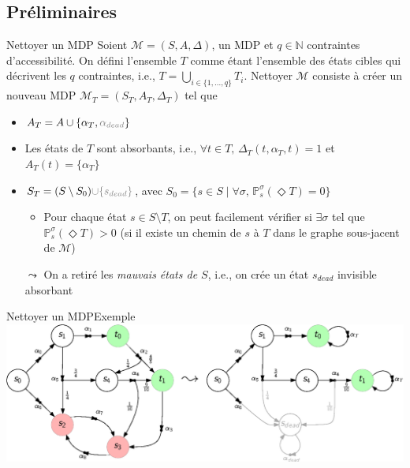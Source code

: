 \documentclass[compress]{beamer}
\theoremstyle{theorem}%
\begin{document}
\subsection{Préliminaires}
\begin{frame}{Nettoyer un MDP}
\footnotesize
  Soient $\mathcal{M} = (S, A, \Delta)$, un MDP et $q \in \mathbb{N}$ contraintes d'accessibilité. On défini l'ensemble $T$ comme étant l'ensemble des états cibles qui décrivent les $q$ contraintes, i.e., $T = \bigcup_{i \in \{1, \dots, q \}} T_i$. {\color{fibeamer@blue}Nettoyer $\mathcal{M}$ consiste à créer un nouveau MDP $\mathcal{M}_T = (S_T, A_T, \Delta_T)$ tel que}
  \begin{itemize}
    \item $A_T = A \cup \{\alpha_T, {\color{gray}\alpha_{dead}}\}$
    \item Les états de $T$ sont absorbants, i.e., $\forall t \in T, \,
      \Delta_T(t, \alpha_T, t) = 1$ et $A_T(t) = \{\alpha_T\}$
    \item $S_T = (S \setminus S_0) {\color{gray}\cup \{s_{dead}\}}$, avec
    $S_0 = \{ s \in S \; | \; \forall \sigma, \, \mathbb{P}^\sigma_s(\Diamond T) = 0 \}$
    \begin{itemize}
      \item {\scriptsize Pour chaque état $s \in S \setminus T$, on peut facilement vérifier si $\exists \sigma$ tel que
    $\mathbb{P}_s^\sigma (\Diamond T) > 0$ (si il existe un chemin de $s$ à $T$ dans le graphe sous-jacent de $\mathcal{M}$)}
    \end{itemize}
    \item[$\leadsto$] On a retiré les \textit{mauvais états de $S$}, i.e., on crée un état \alert{$s_{dead}$ invisible absorbant}
  \end{itemize}
\end{frame}

\begin{frame}{Nettoyer un MDP}{Exemple}
  \includegraphics[width=\linewidth]{resources/clean-up}
\end{frame}
\end{document}

